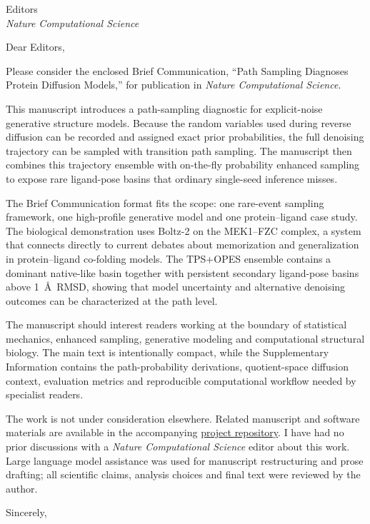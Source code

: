 \documentclass[11pt]{letter}
\begin{document}
\begin{letter}{Editors\\
\textit{Nature Computational Science}}

\opening{Dear Editors,}

Please consider the enclosed Brief Communication, ``Path Sampling Diagnoses
Protein Diffusion Models,'' for publication in \textit{Nature Computational
Science}.

This manuscript introduces a path-sampling diagnostic for explicit-noise
generative structure models. Because the random variables used during reverse
diffusion can be recorded and assigned exact prior probabilities, the full
denoising trajectory can be sampled with transition path sampling. The
manuscript then combines this trajectory ensemble with on-the-fly probability
enhanced sampling to expose rare ligand-pose basins that ordinary single-seed
inference misses.

The Brief Communication format fits the scope: one rare-event sampling
framework, one high-profile generative model and one protein--ligand case
study. The biological demonstration uses Boltz-2 on the MEK1--FZC complex, a
system that connects directly to current debates about memorization and
generalization in protein--ligand co-folding models. The TPS+OPES ensemble
contains a dominant native-like basin together with persistent secondary
ligand-pose basins above 1~\AA\ RMSD, showing that model uncertainty and
alternative denoising outcomes can be characterized at the path level.

The manuscript should interest readers working at the boundary of statistical
mechanics, enhanced sampling, generative modeling and computational structural
biology.
The main text is intentionally compact, while the Supplementary Information
contains the path-probability derivations, quotient-space diffusion context,
evaluation metrics and reproducible computational workflow needed by specialist
readers.

The work is not under consideration elsewhere. Related manuscript and software
materials are available in the accompanying
\href{https://github.com/muhammadhasyim/tps-diffusion-model}{project repository}.
I have had no prior discussions with a \textit{Nature Computational Science}
editor about this work. Large language model assistance was used for manuscript
restructuring and prose drafting; all scientific claims, analysis choices and
final text were reviewed by the author.

\closing{Sincerely,}

\end{letter}
\end{document}
